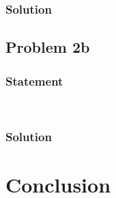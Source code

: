 \documentclass[conf]{new-aiaa}
\begin{document}

\subsubsection*{Solution} 





\subsection*{Problem 2b} 

\subsubsection*{Statement} 
\begin{center}
	 \\
\end{center}


\subsubsection*{Solution} 



\section*{Conclusion} 

\end{document}
